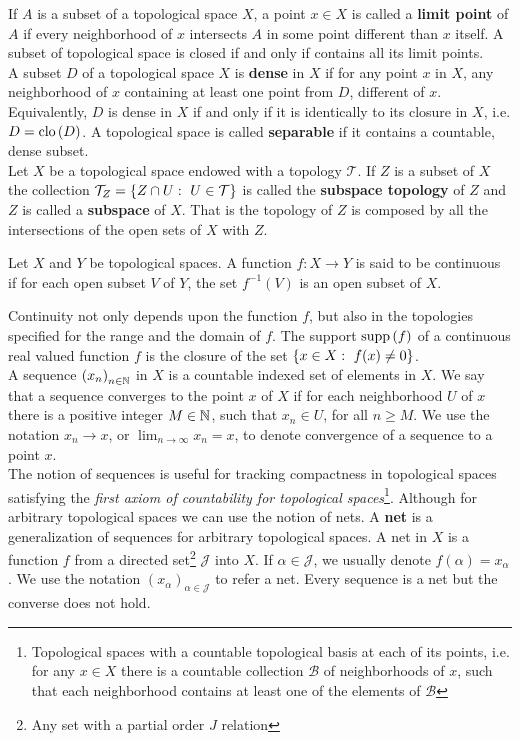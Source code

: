  If $A$ is a subset of a topological space $X$, a point $x\in X$ is called a \textbf{limit point} of $A$ if every neighborhood of $x$ intersects $A$ in some point different than $x$ itself. A subset of topological space is closed if and only if contains all its limit points.    
\\
A subset $D$ of a topological space $X$ is \textbf{dense} in $X$ if for any point $x$ in $X$, any neighborhood of $x$ containing at least one point from $D$, different of $x$. Equivalently, $D$ is dense in $X$ if and only if it is identically to its closure in $X$, i.e. $D=\mathrm{clo}\, (D)$. A topological space is called \textbf{separable} if it contains a countable, dense subset.
\\



Let $X$ be a topological space  endowed with a topology $\mathcal{T}$. If $Z$ is a subset of $X$ the collection $\mathcal{T}_Z=\left\lbrace Z\cap U: \ U \in \mathcal{T} \right\rbrace$ is called the \textbf{subspace topology} of $Z$ and $Z$ is called a \textbf{subspace} of $X$. That is the topology of $Z$ is composed by all the intersections of the open sets of $X$ with $Z$. 


\begin{definition}[Continuity]
Let $X$ and $Y$ be topological spaces. A function $f:X\rightarrow Y$ is said to be continuous if for each open subset $V$ of $Y$, the set $f^{-1}(V)$ is an open subset of $X$.\label{def: Continuity} 
\end{definition}
Continuity not only depends upon the function $f$, but also in the topologies specified for the range and the domain of $f$. The support $\mathrm{supp}\,(f)$ of a continuous real valued function $f$ is the closure of the set $\braces{x\in X:\ f(x)\neq 0}$.\\

A sequence $\left( x_n \right)_{n\in \mathbb{N}}$ in $X$ is a countable indexed set of elements in $X$. We say that a sequence converges to the point $x$ of $X$ if for each neighborhood $U$ of $x$ there is a positive integer $M\in\mathbb{N}$, such that $x_n\in U$, for all $n\geq M$. We use the notation $x_n\rightarrow x$, or $\lim_{n\rightarrow \infty} x_n = x$, to denote convergence of a sequence to a point $x$. \\

The notion of sequences is useful for tracking compactness in topological spaces satisfying the \emph{first axiom of countability for topological spaces}\footnote{Topological spaces with a countable topological basis at each of its points, i.e. for any $x\in X$ there is a countable collection $\mathcal{B}$ of neighborhoods of $x$, such that each neighborhood contains at least one of the elements of $\mathcal{B}$}. Although for arbitrary topological spaces we can use the notion of nets. A \textbf{net} is a generalization of sequences for arbitrary topological spaces. A net in $X$ is a function $f$ from a directed set\footnote{Any set with a partial order $J$ relation} $\mathcal{J}$ into $X$. If $\alpha \in \mathcal{J}$, we usually denote $f(\alpha)=x_\alpha$. We use the notation $(x_\alpha)_{\alpha \in \mathcal{J}}$ to refer a net. Every sequence is a net but the converse does not hold.

